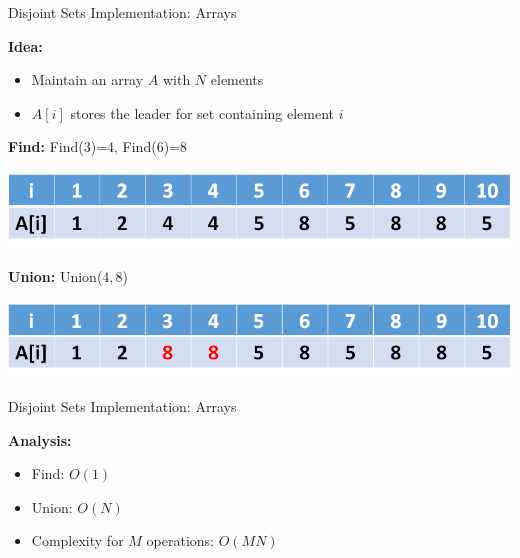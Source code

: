 \documentclass{beamer}
\begin{document}
\begin{frame}{Disjoint Sets Implementation: Arrays}

        {\bf Idea:} 
        \begin{itemize}
            \item Maintain an array $A$ with $N$ elements
            \item $A[i]$ stores the leader for set containing element $i$
        \end{itemize}

        {\bf Find:} Find($3$)=$4$, Find($6$)=$8$ 
        \begin{center}
            \includegraphics[scale=0.4]{unionFindArray1.png}
        \end{center}
        {\bf Union:} Union($4,8$)
        \begin{center}
            \includegraphics[scale=0.4]{unionFindArray2.png}
        \end{center}
\end{frame}

\begin{frame}{Disjoint Sets Implementation: Arrays}

    {\bf Analysis:}
    \begin{itemize}
        \item Find: \pause $O(1)$
        \item Union: \pause $O(N)$
        \item Complexity for $M$ operations: $O(MN)$
    \end{itemize}
\end{frame}
\end{document}
